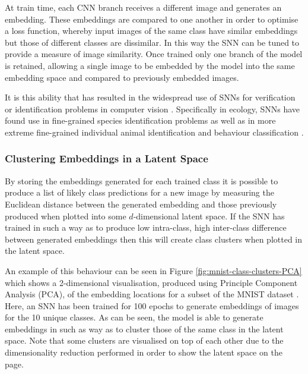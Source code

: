 At train time, each CNN branch receives a different image and generates an embedding. These embeddings are compared to one another in order to optimise a loss function, whereby input images of the same class have similar embeddings but those of different classes are dissimilar. In this way the SNN can be tuned to provide a measure of image similarity. Once trained only one branch of the model is retained, allowing a single image to be embedded by the model into the same embedding space and compared to previously embedded images.

It is this ability that has resulted in the widespread use of SNNs for verification or identification problems in computer vision \cite{dey_signet_2017, wang_discriminative_2020}. Specifically in ecology, SNNs have found use in fine-grained species identification problems \cite{vetrova_hidden_2018, araujo_two-view_2022} as well as in more extreme fine-grained individual animal identification \cite{clapham_automated_2020} and behaviour classification \cite{brookes_triple-stream_2023}. 

\subsubsection{Clustering Embeddings in a Latent Space}\label{ch:ID,sec:deciding,sub:SNN,subsub:ClusteringEmbeddings}

By storing the embeddings generated for each trained class it is possible to produce a list of likely class predictions for a new image by measuring the Euclidean distance between the generated embedding and those previously produced when plotted into some $d$-dimensional latent space. If the SNN has trained in such a way as to produce low intra-class, high inter-class difference between generated embeddings then this will create class clusters when plotted in the latent space. 

An example of this behaviour can be seen in Figure \ref{fig:mnist-class-clusters-PCA} which shows a 2-dimensional visualisation, produced using Principle Component Analysis (PCA), of the embedding locations for a subset of the MNIST dataset \cite{lecun_gradient-based_1998}. Here, an SNN has been trained for 100 epochs to generate embeddings of images for the 10 unique classes. As can be seen, the model is able to generate embeddings in such as way as to cluster those of the same class in the latent space. Note that some clusters are visualised on top of each other due to the dimensionality reduction performed in order to show the latent space on the page. 

